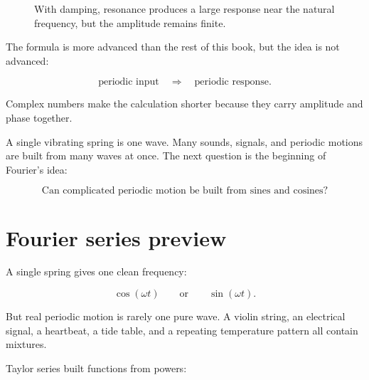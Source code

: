 \begin{figure}[h]
\centering
{}
\caption{With damping, resonance produces a large response near the natural frequency, but the amplitude remains finite.}
\label{fig:damped-forced-response}
\end{figure}

The formula is more advanced than the rest of this book, but the idea is not advanced:

\[
\boxed{
\text{periodic input} \quad\Longrightarrow\quad \text{periodic response}.
}
\]

Complex numbers make the calculation shorter because they carry amplitude and phase
together.

A single vibrating spring is one wave.  Many sounds, signals, and periodic motions are
built from many waves at once.  The next question is the beginning of Fourier's idea:

\[
\text{Can complicated periodic motion be built from sines and cosines?}
\]

\section{Fourier series preview}
\label{sec:fourier-series-preview}

A single spring gives one clean frequency:

\[
\cos(\omega t)
\qquad\text{or}\qquad
\sin(\omega t).
\]

But real periodic motion is rarely one pure wave.  A violin string, an electrical signal,
a heartbeat, a tide table, and a repeating temperature pattern all contain mixtures.

Taylor series built functions from powers:

